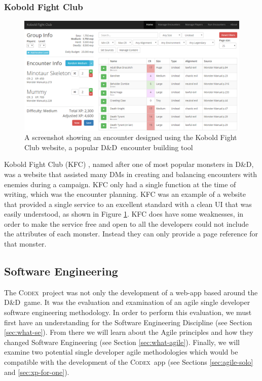 \documentclass[final]{cmpreport}
\newcommand{\dnd}{D\&D}
\newcommand{\Codex}{\textsc{Codex}}
\begin{document}
			\subsubsection{Kobold Fight Club} \label{sec:kfc}
			\begin{figure}
				\centering
				\includegraphics[width=0.8\linewidth]{kfc-screenshot.png}
				\caption[Kobold Fight Club Screenshot]{A screenshot showing an encounter designed using the Kobold Fight Club website, a popular \dnd \ encounter building tool}\label{fig:kfc}
			\end{figure}
			
			
			Kobold Fight Club (KFC) \citep{kfc-homepage}, named after one of most popular monsters in \dnd, was a website that assisted many DMs in creating and balancing encounters with enemies during a campaign. KFC only had a single function at the time of writing, which was the encounter planning. KFC was an example of a website that provided a single service to an excellent standard with a clean UI that was easily understood, as shown in Figure \ref{fig:kfc}. KFC does have some weaknesses, in order to make the service free and open to all the developers could not include the attributes of each monster. Instead they can only provide a page reference for that monster.
	
		\subsection{Software Engineering} \label{sec:software-eng}
		The \Codex \ project was not only the development of a web-app based around the \dnd \ game. It was the evaluation and examination of an agile single developer software engineering methodology. In order to perform this evaluation, we must first have an understanding for the Software Engineering Discipline (see Section \ref{sec:what-se}). From there we will learn about the Agile principles and how they changed Software Engineering (see Section \ref{sec:what-agile}). Finally, we will examine two potential single developer agile methodologies which would be compatible with the development of the \Codex \ app (see Sections \ref{sec:agile-solo} and \ref{sec:xp-for-one}). 
			
\end{document}
